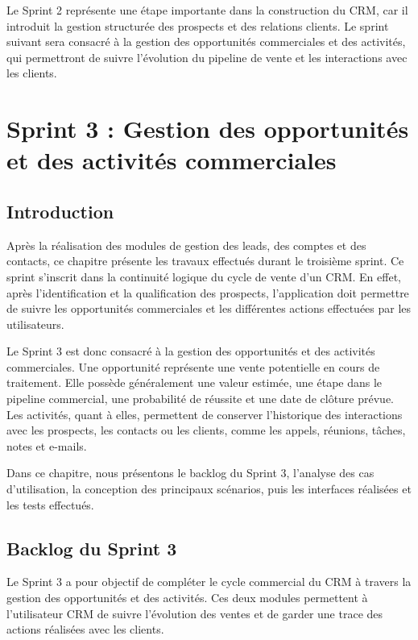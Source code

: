 \documentclass[12pt,a4paper]{report}
\begin{document}
Le Sprint 2 représente une étape importante dans la construction du CRM, car il introduit la gestion structurée des prospects et des relations clients. Le sprint suivant sera consacré à la gestion des opportunités commerciales et des activités, qui permettront de suivre l’évolution du pipeline de vente et les interactions avec les clients.
\chapter{Sprint 3 : Gestion des opportunités et des activités commerciales}

\section*{Introduction}

Après la réalisation des modules de gestion des leads, des comptes et des contacts, ce chapitre présente les travaux effectués durant le troisième sprint. Ce sprint s’inscrit dans la continuité logique du cycle de vente d’un CRM. En effet, après l’identification et la qualification des prospects, l’application doit permettre de suivre les opportunités commerciales et les différentes actions effectuées par les utilisateurs.

Le Sprint 3 est donc consacré à la gestion des opportunités et des activités commerciales. Une opportunité représente une vente potentielle en cours de traitement. Elle possède généralement une valeur estimée, une étape dans le pipeline commercial, une probabilité de réussite et une date de clôture prévue. Les activités, quant à elles, permettent de conserver l’historique des interactions avec les prospects, les contacts ou les clients, comme les appels, réunions, tâches, notes et e-mails.

Dans ce chapitre, nous présentons le backlog du Sprint 3, l’analyse des cas d’utilisation, la conception des principaux scénarios, puis les interfaces réalisées et les tests effectués.

\section{Backlog du Sprint 3}

Le Sprint 3 a pour objectif de compléter le cycle commercial du CRM à travers la gestion des opportunités et des activités. Ces deux modules permettent à l’utilisateur CRM de suivre l’évolution des ventes et de garder une trace des actions réalisées avec les clients.
\end{document}
